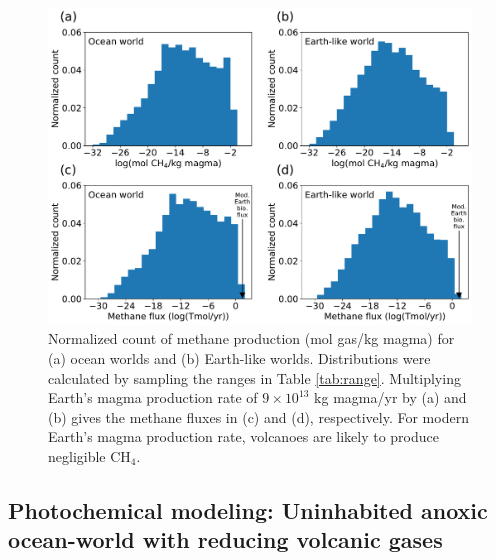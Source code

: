 \begin{figure}
  \centering
  \includegraphics[width=\textwidth]{tex/3methane/figures/CH4_prod.pdf}
  \caption{Normalized count of methane production (mol gas/kg magma) for (a) ocean worlds and (b) Earth-like worlds. Distributions were calculated by sampling the ranges in Table \ref{tab:range}. Multiplying Earth's magma production rate of $9\times10^{13}$ kg magma/yr by (a) and (b) gives the methane fluxes in (c) and (d), respectively. For modern Earth's magma production rate, volcanoes are likely to produce negligible CH$_4$.}
  \label{fig:CH4}
\end{figure}

\subsection{Photochemical modeling: Uninhabited anoxic ocean-world with reducing volcanic gases}\label{sec:photochem}

